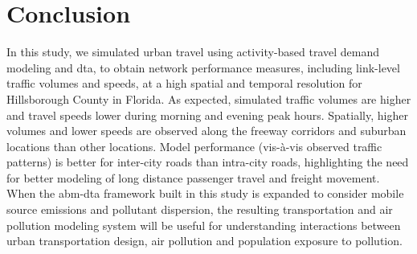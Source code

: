 \section{Conclusion}
In this study, we simulated urban travel using activity-based travel demand modeling and \gls{dta}, to obtain network performance measures, including link-level traffic volumes and speeds, at a high spatial and temporal resolution for Hillsborough County in Florida. 
As expected, simulated traffic volumes are higher and travel speeds lower during morning and evening peak hours. 
Spatially, higher volumes and lower speeds are observed along the freeway corridors and suburban locations than other locations. 
Model performance (vis-à-vis observed traffic patterns) is better for inter-city roads than intra-city roads, highlighting the need for better modeling of long distance passenger travel and freight movement. 
When the \gls{abm}-\gls{dta} framework built in this study is expanded to consider mobile source emissions and pollutant dispersion, the resulting transportation and air pollution modeling system will be useful for understanding interactions between urban transportation design, air pollution and population exposure to pollution.


